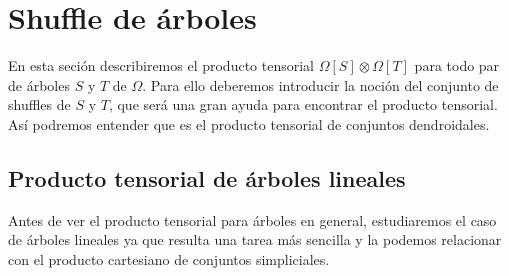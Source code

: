 \documentclass[../main.tex]{subfiles}
\begin{document}
\section{Shuffle de \'arboles}
En esta seci\'on describiremos el producto tensorial $\Omega[S]\otimes\Omega[T]$ para todo par de \'arboles $S$ y $T$ de $\Omega$. Para ello deberemos introducir la noci\'on del conjunto de shuffles de $S$ y $T$, que ser\'a una gran ayuda para encontrar el producto tensorial. As\'i podremos entender que es el producto tensorial de conjuntos dendroidales.
\subsection{Producto tensorial de \'arboles lineales}
Antes de ver el producto tensorial para \'arboles en general, estudiaremos el caso de \'arboles lineales ya que resulta una tarea m\'as sencilla y la podemos relacionar con el producto cartesiano de conjuntos simpliciales.
\end{document}
